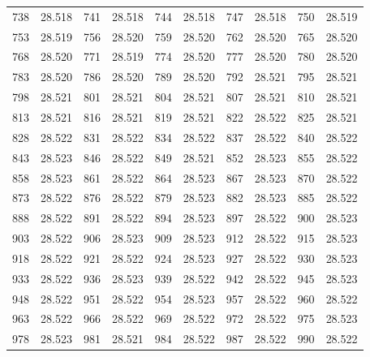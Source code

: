 \documentclass[12pt]{ctexart}
\numberwithin{equation}{section}
\begin{document}
\begin{longtable}{cc|cc|cc|cc|cc}
    738      & 28.518   & 741      & 28.518   & 744      & 28.518   & 747      & 28.518   & 750      & 28.519   \\
    753      & 28.519   & 756      & 28.520   & 759      & 28.520   & 762      & 28.520   & 765      & 28.520   \\
    768      & 28.520   & 771      & 28.519   & 774      & 28.520   & 777      & 28.520   & 780      & 28.520   \\
    783      & 28.520   & 786      & 28.520   & 789      & 28.520   & 792      & 28.521   & 795      & 28.521   \\
    798      & 28.521   & 801      & 28.521   & 804      & 28.521   & 807      & 28.521   & 810      & 28.521   \\
    813      & 28.521   & 816      & 28.521   & 819      & 28.521   & 822      & 28.522   & 825      & 28.521   \\
    828      & 28.522   & 831      & 28.522   & 834      & 28.522   & 837      & 28.522   & 840      & 28.522   \\
    843      & 28.523   & 846      & 28.522   & 849      & 28.521   & 852      & 28.523   & 855      & 28.522   \\
    858      & 28.523   & 861      & 28.522   & 864      & 28.523   & 867      & 28.523   & 870      & 28.522   \\
    873      & 28.522   & 876      & 28.522   & 879      & 28.523   & 882      & 28.523   & 885      & 28.522   \\
    888      & 28.522   & 891      & 28.522   & 894      & 28.523   & 897      & 28.522   & 900      & 28.523   \\
    903      & 28.522   & 906      & 28.523   & 909      & 28.523   & 912      & 28.522   & 915      & 28.523   \\
    918      & 28.522   & 921      & 28.522   & 924      & 28.523   & 927      & 28.522   & 930      & 28.523   \\
    933      & 28.522   & 936      & 28.523   & 939      & 28.522   & 942      & 28.522   & 945      & 28.523   \\
    948      & 28.522   & 951      & 28.522   & 954      & 28.523   & 957      & 28.522   & 960      & 28.522   \\
    963      & 28.522   & 966      & 28.522   & 969      & 28.522   & 972      & 28.522   & 975      & 28.523   \\
    978      & 28.523   & 981      & 28.521   & 984      & 28.522   & 987      & 28.522   & 990      & 28.522   \\

\end{longtable}
\end{document}
